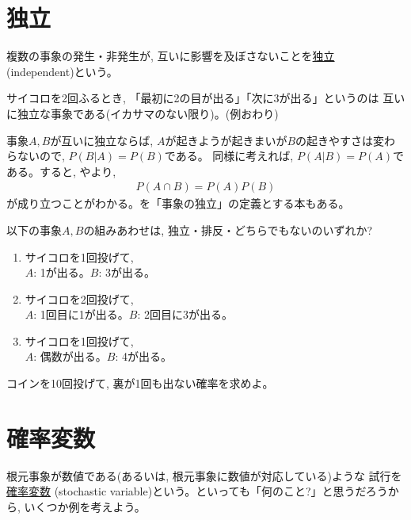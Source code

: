 \section{独立}

複数の事象の発生・非発生が, 互いに影響を及ぼさないことを\underline{独立} 
(independent)という。
\mv

\begin{exmpl}サイコロを2回ふるとき, 「最初に2の目が出る」「次に3が出る」というのは
互いに独立な事象である(イカサマのない限り)。(例おわり)\end{exmpl}
\mv

事象$A, B$が互いに独立ならば, 
$A$が起きようが起きまいが$B$の起きやすさは変わらないので, $P(B|A)=P(B)$である。
同様に考えれば, $P(A|B)=P(A)$である。すると, やより, 
\begin{eqnarray}
P(A\cap B)=P(A)P(B)\label{eq:A_B_independent_PAPB}
\end{eqnarray}
が成り立つことがわかる。を「事象の独立」の定義とする本もある。
\mv

\begin{q}\label{q:stat_dice_indep_excl} 以下の事象$A, B$の組みあわせは, 独立・排反・どちらでもないのいずれか? 
\begin{enumerate}
\item サイコロを1回投げて, \\$A$: 1が出る。$B$: 3が出る。
\item サイコロを2回投げて, \\$A$: 1回目に1が出る。$B$: 2回目に3が出る。
\item サイコロを1回投げて, \\$A$: 偶数が出る。$B$: 4が出る。
\end{enumerate}\end{q}
\mv

\begin{q}\label{q:stat_coin10} コインを10回投げて, 裏が1回も出ない確率を求めよ。\end{q}
\vv



\section{確率変数}

根元事象が数値である(あるいは, 根元事象に数値が対応している)ような
試行を\underline{確率変数} 
(stochastic variable)という。といっても「何のこと?」と思うだろうから, いくつか例を考えよう。

